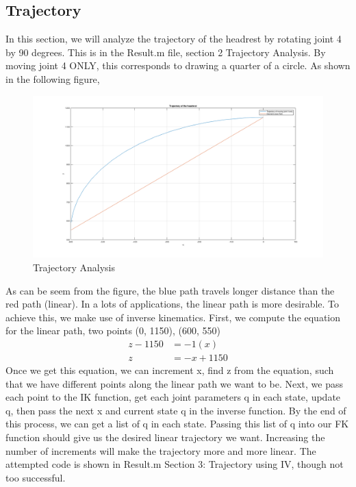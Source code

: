 \documentclass[12pt, letterpaper]{amsart} %
\numberwithin{equation}{section}
\begin{document}
\subsection{Trajectory}
In this section, we will analyze the trajectory of the headrest by rotating joint 4 by 90 degrees. This is in the Result.m file, section 2 Trajectory Analysis. By moving joint 4 ONLY, this corresponds to drawing a quarter of a circle. As shown in the following figure,
\begin{figure}[H]
  \centering
  \includegraphics[scale=0.35]{traj1}
  \caption{Trajectory Analysis}
  \label{fig:2}
\end{figure}
As can be seem from the figure, the blue path travels longer distance than the red path (linear). In a lots of applications, the linear path is more desirable. To achieve this, we make use of inverse kinematics. First, we compute the equation for the linear path, two points (0, 1150), (600, 550)
\begin{align*}
  z - 1150 &= -1 (x) \\
  z &= -x + 1150 
\end{align*}
Once we get this equation, we can increment x, find z from the equation, such that we have different points along the linear path we want to be. Next, we pass each point to the IK function, get each joint parameters q in each state, update q, then pass the next x and current state q in the inverse function. By the end of this process, we can get a list of q in each state. Passing this list of q into our FK function should give us the desired linear trajectory we want. Increasing the number of increments will make the trajectory more and more linear. The attempted code is shown in Result.m Section 3: Trajectory using IV, though not too successful.
\end{document}
